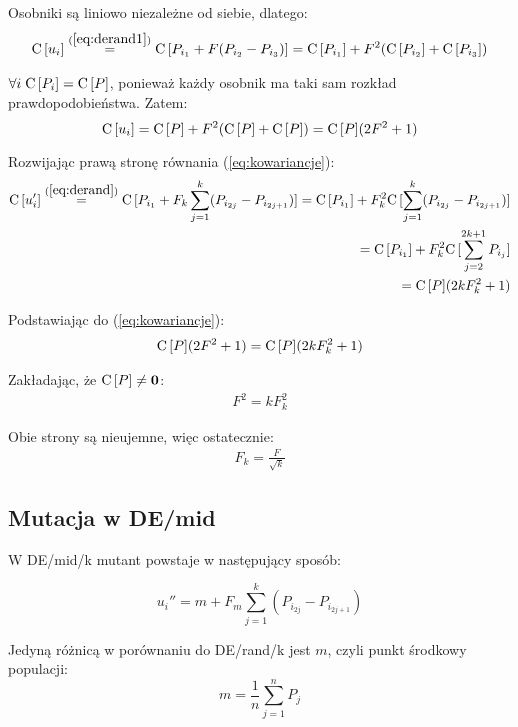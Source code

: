 \documentclass[12pt, a4paper]{article}
\def\C{{\rm C}\,}
\begin{document}
Osobniki są liniowo niezależne od siebie, dlatego:
\begin{align*}
\C[u_i] \overset{(\ref{eq:derand1})}{=} \C[P_{i_1} + F(P_{i_2} - P_{i_3})] = \C[P_{i_1}] + F^2(\C[P_{i_2}] + \C[P_{i_3}])
\end{align*}

$\forall{i}\hspace{1mm}\C[P_i] = \C[P]$, ponieważ każdy osobnik ma taki sam rozkład prawdopodobieństwa. Zatem:
\begin{equation} \label{eq:macierz_kow_mutanta}
\C[u_i] = \C[P] + F^2(\C[P] + \C[P]) = \C[P](2F^2 + 1)
\end{equation}

Rozwijając prawą stronę równania (\ref{eq:kowariancje}):
\begin{align*}
\C[u_i'] \overset{(\ref{eq:derand})}{=} \C[P_{i_1} + F_k\sum\limits_{j=1}^k (P_{i_{2j}} - P_{i_{2j+1}})] 
= \C[P_{i_1}] + F_k^2\C[\sum\limits_{j=1}^k (P_{i_{2j}} - P_{i_{2j+1}})] \\
= \C[P_{i_1}] + F_k^2\C[\sum\limits_{j=2}^{2k+1} P_{i_{j}}] \\
= \C[P](2kF_k^2 + 1)
\end{align*}

Podstawiając do (\ref{eq:kowariancje}):
\begin{align*}
\C[P](2F^2 + 1) = \C[P](2kF_k^2 + 1)
\end{align*}

Zakładając, że $\C[P] \neq \textbf{0}$:
\begin{align*}
F^2 = kF_k^2
\end{align*}

Obie strony są nieujemne, więc ostatecznie:
\begin{align*}
F_k = \frac{F}{\sqrt{k}}
\end{align*}

\subsection{Mutacja w DE/mid}

W DE/mid/k mutant powstaje w następujący sposób:

\begin{equation} \label{eq:demid}
u_i'' = m + F_m\sum\limits_{j=1}^k (P_{i_{2j}} - P_{i_{2j+1}})
\end{equation}

Jedyną różnicą w porównaniu do DE/rand/k jest $m$, czyli punkt środkowy populacji:
\begin{equation} \label{eq:midpoint}
m = \frac{1}{n}\sum\limits_{j=1}^n P_j
\end{equation}
\end{document}
